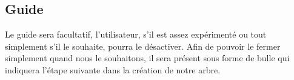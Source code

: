 	\subsection{Guide}
Le guide sera facultatif, l'utilisateur, s'il est assez expérimenté ou tout simplement s'il le souhaite, pourra le désactiver. Afin de pouvoir le fermer simplement quand nous le souhaitons, il sera présent sous forme de bulle qui indiquera l'étape suivante dans la création de notre arbre.